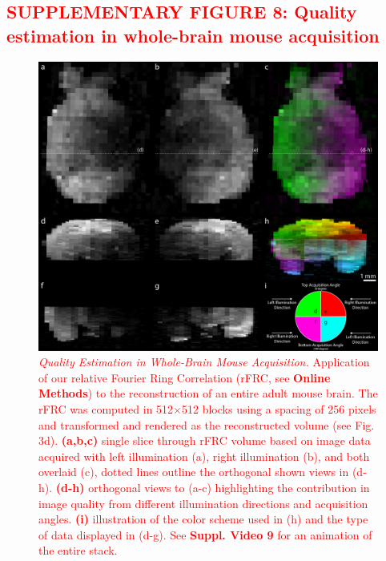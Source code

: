 \documentclass[]{spie}  %
\def\red{\textcolor{red}}
\begin{document}
\subsection*{\red{SUPPLEMENTARY FIGURE 8: Quality estimation in whole-brain mouse acquisition}}
\vspace{1mm}
\begin{figure}[h!]
\includegraphics[width=\textwidth]{rFRC_brain.png}
\vspace{-2.0mm}
\caption{\hspace{-0.5mm} \red{\emph{Quality Estimation in Whole-Brain Mouse Acquisition.} Application of our relative Fourier Ring Correlation (rFRC, see \textbf{Online Methods}) to the reconstruction of an entire adult mouse brain. The rFRC was computed in 512$\times$512 blocks using a spacing of 256 pixels and transformed and rendered as the reconstructed volume (see Fig. 3d). \textbf{(a,b,c)} single slice through rFRC volume based on image data acquired with left illumination (a), right illumination (b), and both overlaid (c), dotted lines outline the orthogonal shown views in (d-h). \textbf{(d-h)} orthogonal views to (a-c) highlighting the contribution in image quality from different illumination directions and acquisition angles. \textbf{(i)} illustration of the color scheme used in (h) and the type of data displayed in (d-g). See \textbf{Suppl. Video 9} for an animation of the entire stack.
}}
\label{fig:sup-rfrc-brain}
\end{figure}

\pagebreak
\end{document}
